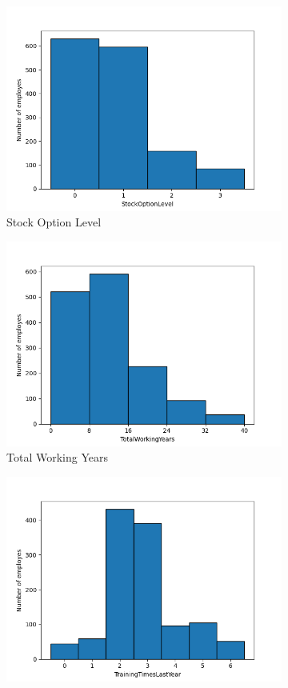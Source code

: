 \documentclass[english]{article}
\begin{document}
\newpage
\begin{figure} [h]
\centering
\begin{subfigure}{.5\textwidth}
  \centering
  \includegraphics[width=.8\linewidth]{Stock Option Level.png}
  \caption{Stock Option Level}
  \label{fig:sfig17}
\end{subfigure}%
\begin{subfigure}{.5\textwidth}
  \centering
  \includegraphics[width=.8\linewidth]{Total Working Years.png}
  \caption{Total Working Years}
  \label{fig:sfig18}
\end{subfigure}
\begin{subfigure}{.5\textwidth}
  \centering
  \includegraphics[width=.8\linewidth]{Training Time Last Year.png}

\end{subfigure}
\end{figure}
\end{document}
